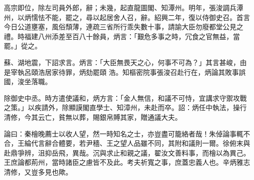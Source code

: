 \begin{pinyinscope}
 高宗即位，除左司員外郎，辭；未幾，起直龍圖閣、知潭州。明年，張浚調兵潭州，以炳懦怯不能，罷之，尋以起居舍人召，辭。紹興二年，復以侍御史召。首言今日公道壅塞，風俗頹薄，連疏三省所行乖失數十事，請諭大臣勿廢都堂公見之禮。時福建八州添差至百八十餘員，炳言：「艱危多事之時，冗食之官無益，當罷。」從之。



 蘇、湖地震，下詔求言。炳言：「大臣無畏天之心，何事不可為？」其言甚峻，由是宰執呂頤浩居家待罪，炳劾罷頤
 浩。知樞密院事張浚召赴行在，炳論其敗事誤國，浚坐落職。



 除御史中丞。時方遣使議和，炳方言：「金人無信，和議不可恃，宜講求守禦攻戰之策。」以疾請外，除顯謨閣直學士、知漳州，未赴而卒。詔：炳任中執法，操行清修，今其云亡，貧無以葬，賜銀帛賻其家，贈通議大夫。



 論曰：秦檜晚薦士以收人望，然一時知名之士，亦豈盡可籠絡者哉！朱倬論事輒不合，王綸代言辭合體要，若尹穡、王之望人品雖不同，其附和議則一爾。徐俯末與
 赴鼎爭辨，沮抑岳飛，異哉。沉與求止和親之議，翟汝文善料事，而檜以為異己。王庶論都荊州，當時諸臣之慮皆不及此。考夫祈寬之事，庶蓋忠義人也。辛炳雅志清修，又豈多見也歟。



\end{pinyinscope}